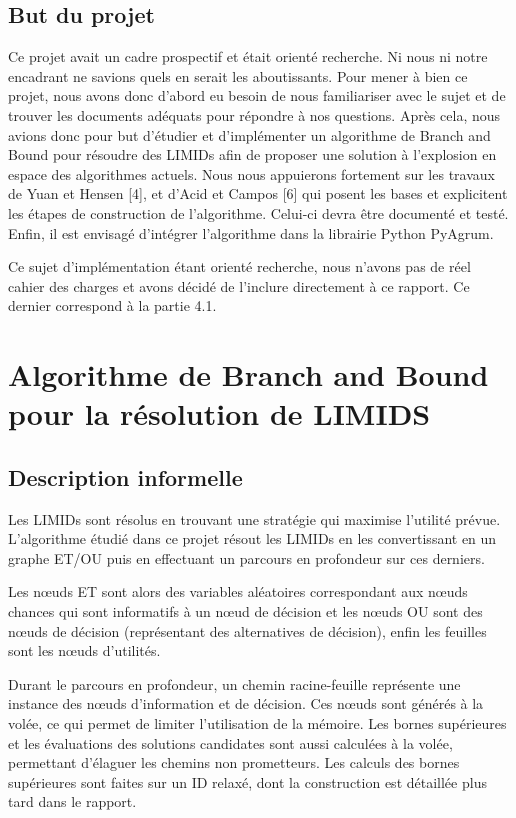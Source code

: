 \documentclass[12pt]{article}
\begin{document}
\subsection{But du projet}
Ce projet avait un cadre prospectif et était orienté recherche. Ni nous ni notre encadrant ne savions quels en serait les aboutissants. Pour mener à bien ce projet, nous avons donc d'abord eu besoin de nous familiariser avec le sujet et de trouver les documents adéquats pour répondre à nos questions. Après cela, nous avions donc pour but d'étudier et d'implémenter un algorithme de Branch and Bound pour résoudre des LIMIDs afin de proposer une solution à l'explosion en espace des algorithmes actuels. Nous nous appuierons fortement sur les travaux de Yuan et Hensen [4], et d'Acid et Campos [6] qui posent les bases et explicitent les étapes de construction de l'algorithme. Celui-ci devra être documenté et testé.
Enfin, il est envisagé d'intégrer l'algorithme dans la librairie Python PyAgrum.

Ce sujet d'implémentation étant orienté recherche, nous n'avons pas de réel cahier des charges et avons décidé de l'inclure directement à ce rapport. Ce dernier correspond à la partie 4.1.    


\section{Algorithme de Branch and Bound pour la résolution de LIMIDS}
\subsection{Description informelle}
Les LIMIDs sont résolus en trouvant une stratégie qui maximise l'utilité prévue.
L'algorithme étudié dans ce projet résout les LIMIDs en les convertissant en un graphe ET/OU puis en effectuant un parcours en profondeur sur ces derniers.

Les nœuds ET sont alors des variables aléatoires correspondant aux nœuds chances qui sont informatifs à un nœud de décision et les nœuds OU sont des nœuds de décision (représentant des alternatives de décision), enfin les feuilles sont les nœuds d'utilités.

Durant le parcours en profondeur, un chemin racine-feuille représente une instance des nœuds d'information et de décision. Ces nœuds sont générés à la volée, ce qui permet de limiter l'utilisation de la mémoire. Les bornes supérieures et les évaluations des solutions candidates sont aussi calculées à la volée, permettant d'élaguer les chemins non prometteurs. Les calculs des bornes supérieures sont faites sur un ID relaxé, dont la construction est détaillée plus tard dans le rapport.
\end{document}
